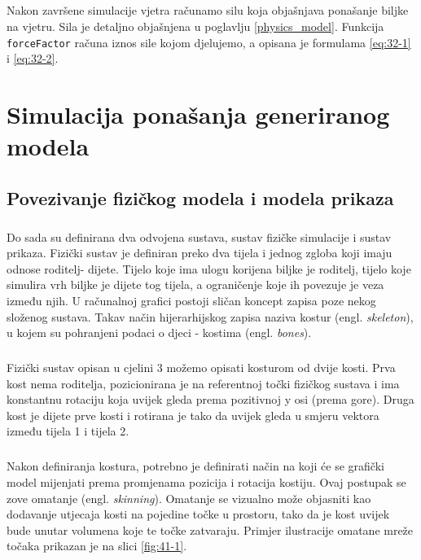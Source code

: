 \documentclass[times, utf8, diplomski]{fer}
\begin{document}
\paragraph{}
Nakon završene simulacije vjetra računamo silu koja objašnjava ponašanje biljke na 
vjetru. Sila je detaljno objašnjena u poglavlju \ref{physics_model}. Funkcija 
\verb#forceFactor# računa iznos sile kojom djelujemo, a opisana je formulama \ref{eq:32-1} i 
\ref{eq:32-2}.

\chapter{Simulacija ponašanja generiranog modela}
\section{Povezivanje fizičkog modela i modela prikaza}
\paragraph{}
Do sada su definirana dva odvojena sustava, sustav fizičke simulacije i sustav prikaza. 
Fizički sustav je definiran preko dva tijela i jednog zgloba koji imaju odnose roditelj-
dijete. Tijelo koje ima ulogu korijena biljke je roditelj, tijelo koje simulira vrh biljke 
je dijete tog tijela, a ograničenje koje ih povezuje je veza između njih. U računalnoj 
grafici postoji sličan koncept zapisa poze nekog složenog sustava. Takav način 
hijerarhijskog zapisa naziva kostur (engl. \textit{skeleton}), u kojem su pohranjeni podaci 
o djeci - kostima (engl. \textit{bones}).

\paragraph{}
Fizički sustav opisan u cjelini 3 možemo opisati kosturom od dvije kosti. Prva kost 
nema roditelja, pozicionirana je na referentnoj točki fizičkog sustava i ima 
konstantnu rotaciju koja uvijek gleda prema pozitivnoj y osi (prema gore). Druga kost 
je dijete prve kosti i rotirana je tako da uvijek gleda u smjeru vektora između tijela 1 
i tijela 2.

\paragraph{}
Nakon definiranja kostura, potrebno je definirati način na koji će se grafički model 
mijenjati prema promjenama pozicija i rotacija kostiju. Ovaj postupak se zove omatanje 
(engl. \textit{skinning}). Omatanje se vizualno može objasniti kao dodavanje utjecaja kosti 
na pojedine točke u prostoru, tako da je kost uvijek bude unutar volumena koje te točke 
zatvaraju. Primjer ilustracije omatane mreže točaka prikazan je na slici \ref{fig:41-1}.
\end{document}
